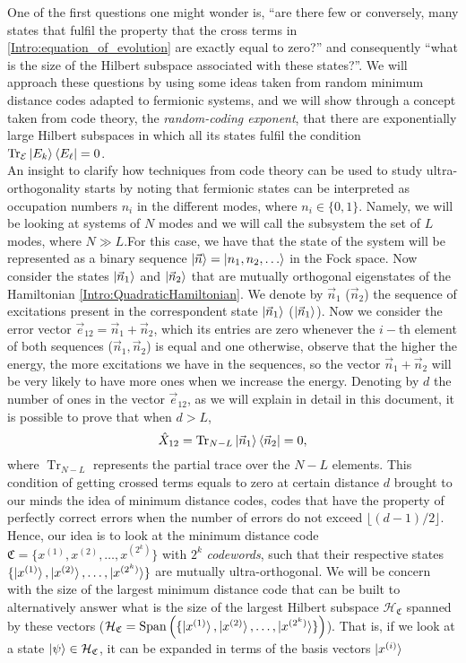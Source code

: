 \indent One of the first questions one might wonder is, ``are there few or conversely, many states that fulfil the property that the cross terms in \eqref{Intro:equation_of_evolution} are exactly equal to zero?'' and consequently ``what is the size of the Hilbert subspace associated with these states?''. We will approach these questions by using some ideas taken from random minimum distance codes adapted to fermionic systems, and we will show through a concept taken from code theory, the \textit{random-coding exponent}, that there are exponentially large Hilbert subspaces in which all its states fulfil the condition $\operatorname{Tr}_{\mathcal{E}}\mathinner{|{E_k}\rangle}\mathinner{\langle{E_\ell}|} = 0$.\\

\indent An insight to clarify how techniques from code theory can be used to study ultra-orthogonality starts by noting that fermionic states can be interpreted as occupation numbers $n_i$ in the different modes, where $n_i \in \{0,1\}$. Namely, we will be looking at systems of $N$ modes and we will call the subsystem the set of $L$ modes, where $N\gg L$.For this case, we have that the state of the system will be represented as a binary sequence $\mathinner{|{\vec{n}}\rangle}=\mathinner{|{n_1,n_2,\ldots}\rangle}$ in the Fock space. Now consider the states $\mathinner{|{\vec{n}_1}\rangle}$ and $\mathinner{|{\vec{n}_2}\rangle}$ that are mutually orthogonal eigenstates of the Hamiltonian \eqref{Intro:QuadraticHamiltonian}. We denote by $\vec{n}_1$ ($\vec{n}_2$) the sequence of excitations present in the correspondent state $\mathinner{|{\vec{n}_1}\rangle}$ ($\mathinner{|{\vec{n}_1}\rangle}$). Now we consider the error vector $\vec{e}_{12}=\vec{n}_1 +\vec{n}_2$, which its entries are zero whenever the $i-$th element of both sequences ($\vec{n}_1 ,\vec{n}_2$) is equal and one otherwise, observe that the higher the energy, the more excitations we have in the sequences, so the vector $\vec{n}_1+\vec{n}_2$ will be very likely to have more ones when we increase the energy. Denoting by $d$ the number of ones in the vector $\vec{e}_{12}$, as we will explain in detail in this document, it is possible to prove that when $d>L$,
 \begin{equation}
 \hat{X}_{12} = \operatorname{Tr}_{N-L}\mathinner{|{\vec{n}_1}\rangle}\mathinner{\langle{\vec{n}_2}|} = 0,
 \end{equation}
where $ \operatorname{Tr}_{N-L}$ represents the partial trace over the $N-L$ elements. This condition of getting crossed terms equals to zero at certain distance $d$ brought to our minds the idea of minimum distance codes, codes that have the property of perfectly correct errors when the number of errors do not exceed $\lfloor(d-1)/2\rfloor$.   Hence, our idea is to look at the minimum distance code $\mathfrak{C}=\{x^{(1)},x^{(2)},\ldots, x^{(2^k)}\}$ with $2^k$ \textit{codewords}, such that their respective states $\{\mathinner{|{x^{(1)}}\rangle},\mathinner{|{x^{(2)}}\rangle},\ldots, \mathinner{|{x^{(2^k)}}\rangle}\}$ are mutually ultra-orthogonal. We will be concern with the size of the largest minimum distance code that can be built to alternatively answer what is the size of the largest Hilbert subspace $\mathcal{H}_{\mathfrak{C}}$ spanned by these vectors ($\mathcal{H}_{\mathfrak{C}} = \operatorname{Span}\left(\{\mathinner{|{x^{(1)}}\rangle},\mathinner{|{x^{(2)}}\rangle},\ldots, \mathinner{|{x^{(2^k)}}\rangle}\}\right)$). That is, if we look at a state $\mathinner{|{\psi}\rangle}\in \mathcal{H}_{\mathfrak{C}}$, it can be expanded in terms of the basis vectors $\mathinner{|{x^{(i)}}\rangle}$
